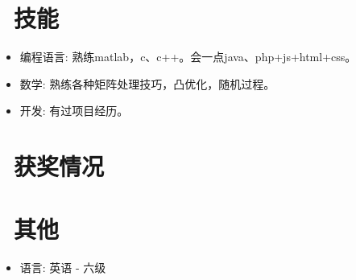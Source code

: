 \documentclass{resume}
\begin{document}
\section{\faCogs\ 技能}
\begin{itemize}[parsep=0.5ex]
  \item 编程语言: 熟练matlab，c、c++。会一点java、php+js+html+css。
  \item 数学: 熟练各种矩阵处理技巧，凸优化，随机过程。
  \item 开发: 有过项目经历。
\end{itemize}

\section{\faHeartO\ 获奖情况}

\section{\faInfo\ 其他}
\begin{itemize}[parsep=0.5ex]
  \item 语言: 英语 - 六级
\end{itemize}
%
%
\end{document}
